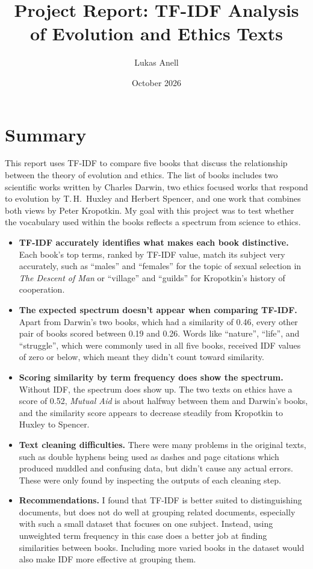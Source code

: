 \documentclass[11pt]{article}
\title{Project Report: TF-IDF Analysis of Evolution and Ethics Texts}
\author{Lukas Anell}
\date{October 2026}
\begin{document}
\maketitle


\section{Summary}

This report uses TF-IDF to compare five books that discuss the relationship between the theory of evolution and ethics.
The list of books includes two scientific works written by Charles Darwin, two ethics focused works that respond to evolution by T.\,H.\ Huxley and Herbert Spencer, and one work that combines both views by Peter Kropotkin.
My goal with this project was to test whether the vocabulary used within the books reflects a spectrum from science to ethics.

\begin{itemize}
    \item \textbf{TF-IDF accurately identifies what makes each book distinctive.}
    Each book's top terms, ranked by TF-IDF value, match its subject very accurately, such as ``males'' and ``females'' for the topic of sexual selection in \emph{The Descent of Man} or ``village'' and ``guilds'' for Kropotkin's history of cooperation.
    \item \textbf{The expected spectrum doesn't appear when comparing TF-IDF.}
    Apart from Darwin's two books, which had a similarity of 0.46, every other pair of books scored between 0.19 and 0.26.
    Words like ``nature'', ``life'', and ``struggle'', which were commonly used in all five books, received IDF values of zero or below, which meant they didn't count toward similarity.
    \item \textbf{Scoring similarity by term frequency does show the spectrum.}
    Without IDF, the spectrum does show up.
    The two texts on ethics have a score of 0.52, \emph{Mutual Aid} is about halfway between them and Darwin's books, and the similarity score appears to decrease steadily from Kropotkin to Huxley to Spencer.
    \item \textbf{Text cleaning difficulties.}
    There were many problems in the original texts, such as double hyphens being used as dashes and page citations which produced muddled and confusing data, but didn't cause any actual errors.
    These were only found by inspecting the outputs of each cleaning step.
    \item \textbf{Recommendations.}
    I found that TF-IDF is better suited to distinguishing documents, but does not do well at grouping related documents, especially with such a small dataset that focuses on one subject.
    Instead, using unweighted term frequency in this case does a better job at finding similarities between books.
    Including more varied books in the dataset would also make IDF more effective at grouping them.
\end{itemize}
\end{document}

